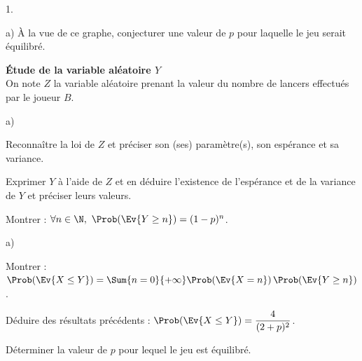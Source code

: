 \documentclass[11pt]{article}%
\begin{document}
\begin{noliste}{1.}
\begin{noliste}{a)}
    À la vue de ce graphe, conjecturer une valeur de $p$ pour laquelle 
    le jeu serait équilibré.
    
    
    
  \end{noliste}
  
  \item {\bf Étude de la variable aléatoire $Y$}\\[.1cm]
  On note $Z$ la variable aléatoire prenant la valeur du nombre de 
  lancers effectués par le joueur $B$.
  \begin{noliste}{a)}
    \setlength{\itemsep}{2mm}
    \item Reconnaître la loi de $Z$ et préciser son (ses) paramètre(s), 
    son espérance et sa variance.
    
    

    
    \item Exprimer $Y$ à l'aide de $Z$ et en déduire l'existence de 
    l'espérance et de la variance de $Y$ et préciser leurs valeurs.
    
    
    
    

    
    \item Montrer : $\forall n \in \N, \ \Prob(\Ev{Y \geq n}) = 
    (1-p)^n$.
    
    
  \end{noliste}
  
  
  
  
  \item 
  \begin{noliste}{a)}
    \setlength{\itemsep}{2mm}
  \item Montrer : $\Prob(\Ev{X \leq Y}) = \Sum{n=0}{+\infty}
    \Prob(\Ev{X=n}) \, \Prob(\Ev{Y \geq n})$.
    
    
    
  \item Déduire des résultats précédents : $\Prob(\Ev{X \leq Y}) =
    \dfrac{4}{(2+p)^2}$.
    
    

    
    \item Déterminer la valeur de $p$ pour lequel le jeu est équilibré.
    
    
  \end{noliste}
\end{noliste}
\end{document}
